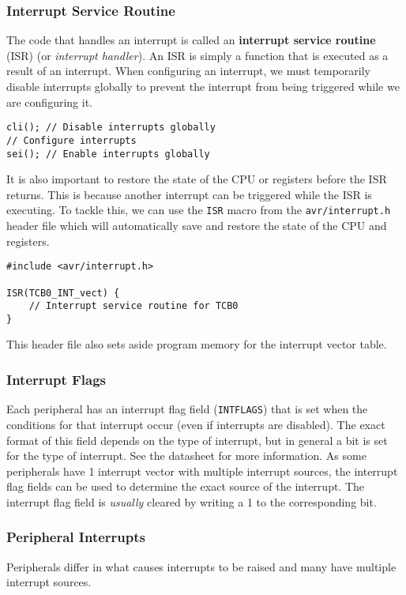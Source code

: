 \documentclass{article}
\begin{document}
\subsubsection{Interrupt Service Routine}
The code that handles an interrupt is called an \textbf{interrupt
service routine} (ISR) (or \textit{interrupt handler}). An ISR is simply
a function that is executed as a result of an interrupt. When
configuring an interrupt, we must temporarily disable interrupts
globally to prevent the interrupt from being triggered while we are
configuring it.
\begin{verbatim}
cli(); // Disable interrupts globally
// Configure interrupts
sei(); // Enable interrupts globally
\end{verbatim}
It is also important to restore the state of the CPU or registers
before the ISR returns. This is because another interrupt can be
triggered while the ISR is executing. To tackle this, we can use the
\texttt{ISR} macro from the \texttt{avr/interrupt.h}
header file which will automatically save and restore the state of the
CPU and registers.
\begin{verbatim}
#include <avr/interrupt.h>

ISR(TCB0_INT_vect) {
    // Interrupt service routine for TCB0
}
\end{verbatim}
This header file also sets aside program memory for the interrupt
vector table.
\subsubsection{Interrupt Flags}
Each peripheral has an interrupt flag field (\texttt{INTFLAGS})
that is set when the conditions for that interrupt occur (even if
interrupts are disabled). The exact format of this field depends on the
type of interrupt, but in general a bit is set for the type of
interrupt. See the datasheet for more information. As some peripherals
have 1 interrupt vector with multiple interrupt sources, the interrupt
flag fields can be used to determine the exact source of the interrupt.
The interrupt flag field is \textit{usually} cleared by writing a 1 to
the corresponding bit.
\subsubsection{Peripheral Interrupts}
Peripherals differ in what causes interrupts to be raised and many have
multiple interrupt sources.
\end{document}
